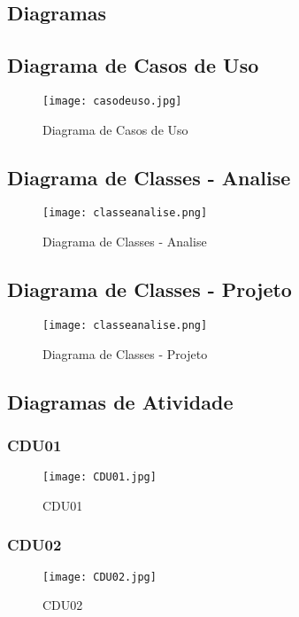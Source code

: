 \begin{landscape}
\section{Diagramas}\label{diagramas}

\subsection{Diagrama de Casos de Uso}
\begin{figure}[htb]
	\centering
	\texttt{[image: casodeuso.jpg]}
	\caption{Diagrama de Casos de Uso}
\end{figure}
\clearpage

\subsection{Diagrama de Classes - Analise}
\begin{figure}[htb]
	\centering
	\texttt{[image: classeanalise.png]}
	\caption{Diagrama de Classes - Analise}
\end{figure}
\clearpage

\subsection{Diagrama de Classes - Projeto}
\begin{figure}[htb]
	\centering
	\texttt{[image: classeanalise.png]}
	\caption{Diagrama de Classes - Projeto}
\end{figure}
\clearpage

\subsection{Diagramas de Atividade}
\subsubsection{CDU01}
\begin{figure}[htb]
	\centering
	\texttt{[image: CDU01.jpg]}
	\caption{CDU01}
\end{figure}
\clearpage
%
\subsubsection{CDU02}
\begin{figure}[htb]
	\centering
	\texttt{[image: CDU02.jpg]}
	\caption{CDU02}
\end{figure}
\clearpage
%

\end{landscape}
